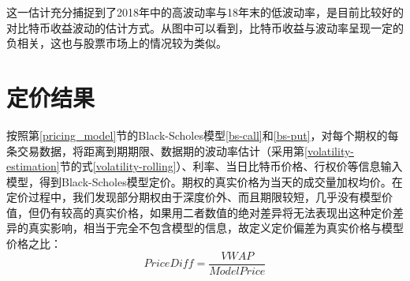     这一估计充分捕捉到了2018年中的高波动率与18年末的低波动率，是目前比较好的对比特币收益波动的估计方式。从图中可以看到，比特币收益与波动率呈现一定的负相关，这也与股票市场上的情况较为类似。
    \section{定价结果}
按照第\ref{pricing_model}节的Black-Scholes模型\ref{bs-call}和\ref{bs-put}，对每个期权的每条交易数据，将距离到期期限、数据期的波动率估计（采用第\ref{volatility-estimation}节的式\ref{volatility-rolling}）、利率、当日比特币价格、行权价等信息输入模型，得到Black-Scholes模型定价。期权的真实价格为当天的成交量加权均价。在定价过程中，我们发现部分期权由于深度价外、而且期限较短，几乎没有模型价值，但仍有较高的真实价格，如果用二者数值的绝对差异将无法表现出这种定价差异的真实影响，相当于完全不包含模型的信息，故定义定价偏差为真实价格与模型价格之比：
\begin{equation}
    Price Diff=\frac{VWAP}{Model Price}
    \label{eq:diff}
\end{equation}

